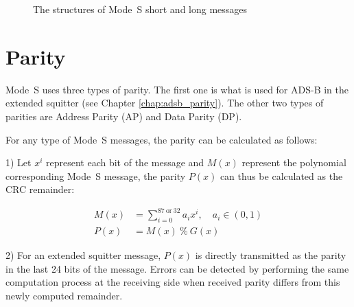 \begin{figure}[!ht]
  \centering
  \caption{The structures of Mode~S short and long messages}
  \label{fig:modes_msg_structures}
\end{figure}




\section{Parity} \label{sec:parity}

Mode~S uses three types of parity. The first one is what is used for ADS-B in the extended squitter (see Chapter \ref{chap:adsb_parity}). The other two types of parities are Address Parity (AP) and Data Parity (DP).

For any type of Mode~S messages, the parity can be calculated as follows:

1) Let  $x^{i}$ represent each bit of the message and $M(x)$ represent the polynomial corresponding Mode~S message, the parity $P(x)$ can thus be calculated as the CRC remainder:

\begin{equation} \label{eq:crc}
  \begin{split}
    M(x) &= \sum_{i=0}^{87~\mathrm{or}~32} a_i x^i , \quad a_i \in (0, 1)\\
    P(x) &= M(x) ~ \% ~ G(x)
  \end{split}
\end{equation}

2) For an extended squitter message, $P(x)$ is directly transmitted as the parity in the last 24 bits of the message. Errors can be detected by performing the same computation process at the receiving side when received parity differs from this newly computed remainder.

